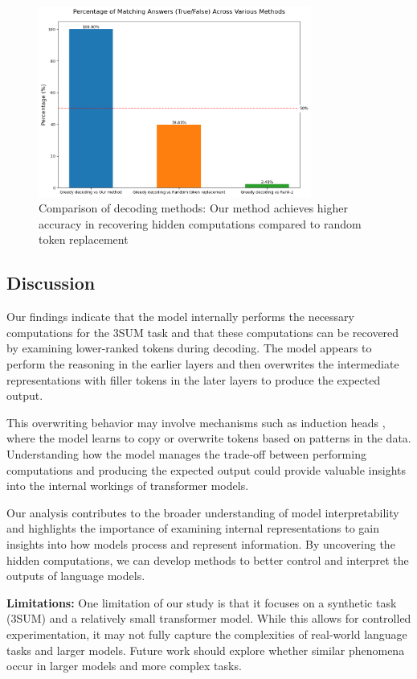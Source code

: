 \documentclass{article}
\begin{document}
\begin{figure}[H]
\centering
\includegraphics[width=0.8\textwidth]{token_comparison_percentages.png}
\caption{Comparison of decoding methods: Our method achieves higher accuracy in recovering hidden computations compared to random token replacement}
\label{fig:token_comparison}
\end{figure}

\subsection{Discussion}

Our findings indicate that the model internally performs the necessary computations for the 3SUM task and that these computations can be recovered by examining lower-ranked tokens during decoding. The model appears to perform the reasoning in the earlier layers and then overwrites the intermediate representations with filler tokens in the later layers to produce the expected output.

This overwriting behavior may involve mechanisms such as induction heads \cite{elhage2021mathematical}, where the model learns to copy or overwrite tokens based on patterns in the data. Understanding how the model manages the trade-off between performing computations and producing the expected output could provide valuable insights into the internal workings of transformer models.

Our analysis contributes to the broader understanding of model interpretability and highlights the importance of examining internal representations to gain insights into how models process and represent information. By uncovering the hidden computations, we can develop methods to better control and interpret the outputs of language models.

\textbf{Limitations:} One limitation of our study is that it focuses on a synthetic task (3SUM) and a relatively small transformer model. While this allows for controlled experimentation, it may not fully capture the complexities of real-world language tasks and larger models. Future work should explore whether similar phenomena occur in larger models and more complex tasks.
\end{document}
